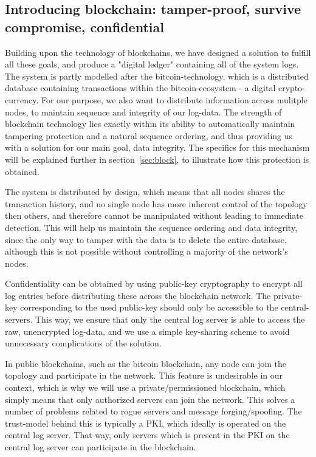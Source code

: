 \subsection{Introducing blockchain: tamper-proof, survive compromise, confidential}
Building upon the technology of blockchains, we have designed a
solution to fulfill all these goals, and produce a "digital ledger"
containing all of the system logs. The system is partly modelled after
the bitcoin-technology, which is a distributed database containing
transactions within the bitcoin-ecosystem - a digital
crypto-currency. For our purpose, we also want to distribute
information across mulitple nodes, to maintain sequence and integrity
of our log-data. The strength of blockchain technology lies exactly
within its ability to automatically maintain tampering protection and
a natural sequence ordering, and thus providing us with a solution for
our main goal, data integrity. The specifics for this mechanism will
be explained further in section~\ref{sec:block}, to illustrate how
this protection is obtained.

The system is distributed by design, which means that all nodes shares
the transaction history, and no single node has more inherent control
of the topology then others, and therefore cannot be manipulated
without leading to immediate detection. This will help us maintain the
sequence ordering and data integrity, since the only way to tamper
with the data is to delete the entire database, although this is not
possible without controlling a majority of the network's nodes.

Confidentiality can be obtained by using public-key cryptography to
encrypt all log entries before distributing these across the
blockchain network. The private-key corresponding to the used
public-key should only be accessible to the central-servers. This way,
we ensure that only the central log server is able to access the raw,
unencrypted log-data, and we use a simple key-sharing scheme to avoid
unnecessary complications of the solution.

In public blockchains, such as the bitcoin blockchain, any node can
join the topology and participate in the network. This feature is
undesirable in our context, which is why we will use a
private/permissioned blockchain, which simply means that only
authorized servers can join the network. This solves a number of
problems related to rogue servers and message forging/spoofing. The
trust-model behind this is typically a PKI, which ideally is operated
on the central log server. That way, only servers which is present in
the PKI on the central log server can participate in the blockchain.

